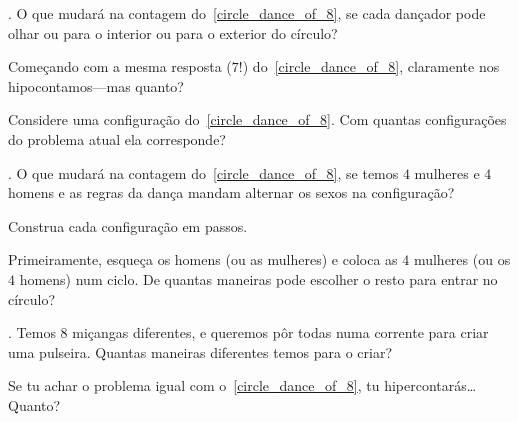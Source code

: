 \exercise.
O que mudará na contagem do~\ref{circle_dance_of_8},
se cada dançador pode olhar ou para o interior ou para o exterior do círculo?

\hint
Começando com a mesma resposta ($7!$) do~\ref{circle_dance_of_8},
claramente nos hipocontamos---mas quanto?

\hint
Considere uma configuração do~\ref{circle_dance_of_8}.
Com quantas configurações do problema atual ela corresponde?

\endexercise

\exercise.
O que mudará na contagem do~\ref{circle_dance_of_8},
se temos $4$ mulheres e $4$ homens e as regras da dança
mandam alternar os sexos na configuração?

\hint
Construa cada configuração em passos.

\hint
Primeiramente, esqueça os homens (ou as mulheres)
e coloca as $4$ mulheres (ou os $4$ homens)
num ciclo.
De quantas maneiras pode escolher o resto para
entrar no círculo?

\endexercise

\exercise.
Temos $8$
miçangas
diferentes, e queremos pôr todas
numa
corrente
para criar uma pulseira.
Quantas maneiras diferentes temos para o criar?

\hint
Se tu achar o problema igual com o~\ref{circle_dance_of_8},
tu hipercontarás\dots Quanto?

